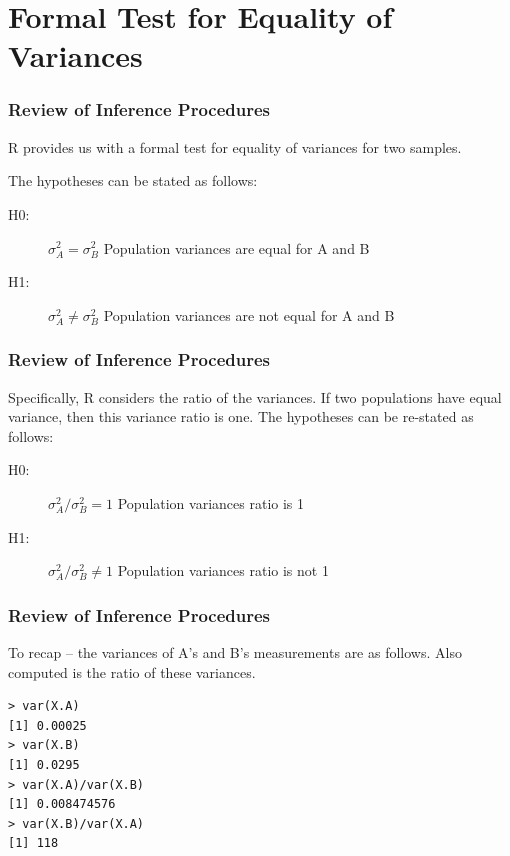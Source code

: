 \documentclass{beamer}
\begin{document}
\section{Formal Test for Equality of Variances}
\begin{frame}
	\frametitle{Review of Inference Procedures}
	\large
{}
R provides us with a formal test for equality of variances for two
samples.

The hypotheses can be stated as follows:
\begin{description}
	\item[H0:] $\sigma^2_A = \sigma^2_B$ Population variances are equal for A and B
	\item[H1:] $\sigma^2_A \neq \sigma^2_B$ Population variances are not equal for A and B
\end{description}


\end{frame}
\begin{frame}
	\frametitle{Review of Inference Procedures}
	\Large
	Specifically, R considers the ratio of the variances. If two
populations have equal variance, then this variance ratio is one.
The hypotheses can be re-stated as follows:

\begin{description}
	\item[H0:] $\sigma^2_A / \sigma^2_B = 1 $ Population variances ratio is 1
	\item[H1:] $\sigma^2_A / \sigma^2_B \neq 1$ Population variances ratio is not 1
\end{description}
\end{frame}
\begin{frame}[fragile]
	\frametitle{Review of Inference Procedures}
	\Large
To recap – the variances of A’s and B’s measurements are as
follows. Also computed is the ratio of these variances.
\begin{framed}
\begin{verbatim}
> var(X.A)
[1] 0.00025
> var(X.B)
[1] 0.0295
> var(X.A)/var(X.B)
[1] 0.008474576
> var(X.B)/var(X.A)
[1] 118
\end{verbatim}

\end{framed}
\end{frame}
\end{document}
